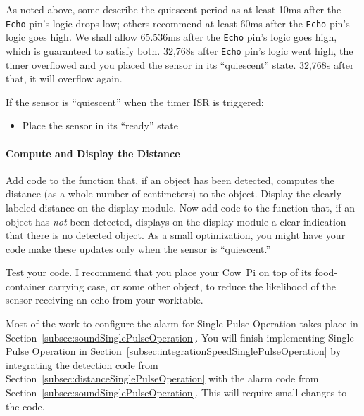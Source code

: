As noted above, some describe the quiescent period as at least 10ms after the \texttt{Echo} pin's logic drops low; others recommend at least 60ms after the \texttt{Echo} pin's logic goes high.
We shall allow 65.536ms after the \texttt{Echo} pin's logic goes high, which is guaranteed to satisfy both.
32,768\textmu s after \texttt{Echo} pin's logic went high, the timer overflowed and you placed the sensor in its ``quiescent'' state.
32,768\textmu s after that, it will overflow again.

If the sensor is ``quiescent'' when the timer ISR is triggered:
\begin{itemize}
    \item Place the sensor in its ``ready'' state
\end{itemize}

\paragraph{Compute and Display the Distance}

Add code to the  function that, if an object has been detected, computes the distance (as a whole number of centimeters) to the object.
Display the clearly-labeled distance on the display module.
Now add code to the  function that, if an object has \textit{not} been detected, displays on the display module a clear indication that there is no detected object.
As a small optimization, you might have your code make these updates only when the sensor is ``quiescent.''

\vspace{0.5cm}

Test your code.
I recommend that you place your Cow~Pi on top of its food-container carrying case, or some other object, to reduce the likelihood of the sensor receiving an echo from your worktable.

\vspace{0.5cm}

Most of the work to configure the alarm for Single-Pulse Operation takes place in Section~\ref{subsec:soundSinglePulseOperation}.
You will finish implementing Single-Pulse Operation in Section~\ref{subsec:integrationSpeedSinglePulseOperation} by integrating the detection code from Section~\ref{subsec:distanceSinglePulseOperation} with the alarm code from Section~\ref{subsec:soundSinglePulseOperation}.
This will require small changes to the code.
